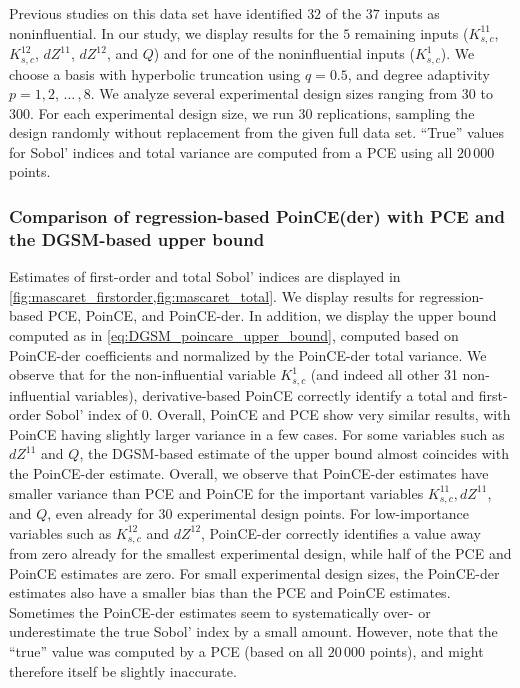 \documentclass[a4paper,11pt]{article}
\newcommand{\enum}{ , \, \dots \,,}
\renewcommand{\citep}[2][]{\cite[#1]{#2}}
\theoremstyle{definition}
\theoremstyle{remark}
\theoremstyle{theorem}
\begin{document}
Previous studies on this data set \citep{Petit2016,roubar17} have identified $32$ of the $37$ inputs as noninfluential.
In our study, we display results for the $5$ remaining inputs ($K_{s,c}^{11}$, $K_{s,c}^{12}$, $dZ^{11}$, $dZ^{12}$, and $Q$) and for one of the noninfluential inputs ($K_{s,c}^1$).
We choose a basis with hyperbolic truncation using $q = 0.5$, and degree adaptivity $p = 1,2 \enum 8$. We analyze several experimental design sizes ranging from $30$ to $300$. For each experimental design size, we run 30 replications, sampling the design randomly without replacement from the given full data set. 
``True'' values for Sobol' indices and total variance are computed from a PCE using all $20\,000$ points.

\subsubsection{Comparison of regression-based PoinCE(der) with PCE and the DGSM-based upper bound}
Estimates of first-order and total Sobol' indices are displayed in \cref{fig:mascaret_firstorder,fig:mascaret_total}. We display results for regression-based PCE, PoinCE, and PoinCE-der. In addition, we display the upper bound computed as in \eqref{eq:DGSM_poincare_upper_bound}, computed based on PoinCE-der coefficients and normalized by the PoinCE-der total variance.
We observe that for the non-influential variable $K_{s,c}^1$ (and indeed all other 31 non-influential variables), derivative-based PoinCE correctly identify a total and first-order Sobol' index of $0$. 
Overall, PoinCE and PCE show very similar results, with PoinCE having slightly larger variance in a few cases. 
For some variables such as $dZ^{11}$ and $Q$, the DGSM-based estimate of the upper bound almost coincides with the PoinCE-der estimate. 
Overall, we observe that PoinCE-der estimates have smaller variance than PCE and PoinCE for the important variables $K_{s,c}^{11}, dZ^{11}$, and $Q$, even already for 30 experimental design points. For low-importance variables such as $K_{s,c}^{12}$ and $dZ^{12}$, PoinCE-der correctly identifies a value away from zero already for the smallest experimental design, while half of the PCE and PoinCE estimates are zero. 
For small experimental design sizes, the PoinCE-der estimates also have a smaller bias than the PCE and PoinCE estimates. Sometimes the PoinCE-der estimates seem to systematically over- or underestimate the true Sobol' index by a small amount. However, note that the ``true'' value was computed by a PCE (based on all $20\,000$ points), and might therefore itself be slightly inaccurate.
\end{document}
